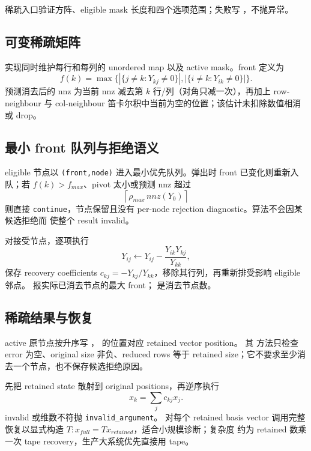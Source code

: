 稀疏入口验证方阵、eligible mask 长度和四个选项范围；失败写 ，不抛异常。

\subsection{可变稀疏矩阵}

实现同时维护每行和每列的 unordered map 以及 active mask。front 定义为
\begin{equation}
f(k)=\max\{|\{j\ne k:Y_{kj}\ne0\}|,
             |\{i\ne k:Y_{ik}\ne0\}|\}.
\end{equation}
预测消去后的 nnz 为当前 nnz 减去第 $k$ 行/列（对角只减一次），再加上 row-neighbour 与
col-neighbour 笛卡尔积中当前为空的位置；该估计未扣除数值相消或 drop。

\subsection{最小 front 队列与拒绝语义}

eligible 节点以 \texttt{(front,node)} 进入最小优先队列。弹出时 front 已变化则重新入队；若
$f(k)>f_{max}$、pivot 太小或预测 nnz 超过
\begin{equation}
\left\lceil\rho_{max}\,nnz(Y_0)\right\rceil
\end{equation}
则直接 \texttt{continue}，节点保留且没有 per-node rejection diagnostic。算法不会因某候选拒绝而
使整个 result invalid。

对接受节点，逐项执行
\begin{equation}
Y_{ij}\leftarrow Y_{ij}-\frac{Y_{ik}Y_{kj}}{Y_{kk}},
\end{equation}
保存 recovery coefficients $c_{kj}=-Y_{kj}/Y_{kk}$，移除其行列，再重新排受影响 eligible 邻点。
 报实际已消去节点的最大 front； 是消去节点数。

\subsection{稀疏结果与恢复}

active 原节点按升序写 ， 的位置对应 retained vector position。
其  方法只检查 error 为空、original size 非负、reduced rows 等于 retained
size；它不要求至少消去一个节点，也不保存候选拒绝原因。

 先把 retained state 散射到 original positions，再逆序执行
\begin{equation}
x_k=\sum_j c_{kj}x_j.
\end{equation}
invalid 或维数不符抛 \texttt{invalid\_argument}。 对每个
retained basis vector 调用完整恢复以显式构造 $T:x_{full}=Tx_{retained}$，适合小规模诊断；复杂度
约为 retained 数乘一次 tape recovery，生产大系统优先直接用 tape。

